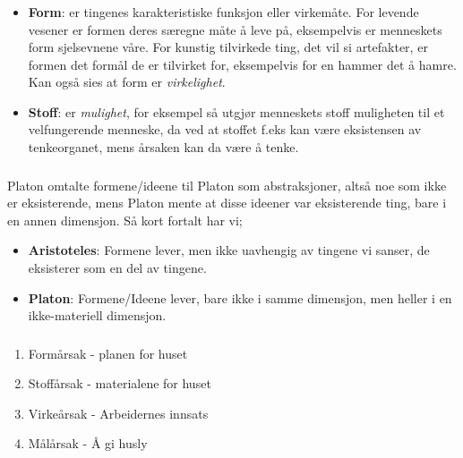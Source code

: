\documentclass[a4paper]{IEEEtran}
\begin{document}
        \subsubsection{}
        \begin{itemize}
            \item \textbf{Form}: er tingenes karakteristiske funksjon eller virkemåte.
            For levende vesener er formen deres særegne måte å leve på, 
            eksempelvis er menneskets form sjelsevnene våre. For kunstig tilvirkede
            ting, det vil si artefakter, er formen det formål de er tilvirket for,
            eksempelvis for en hammer det å hamre. Kan også sies at form er 
            \textit{virkelighet}.

            \item \textbf{Stoff}: er \textit{mulighet}, for eksempel så 
            utgjør menneskets stoff muligheten til et velfungerende menneske, da 
            ved at stoffet f.eks kan være eksistensen av tenkeorganet, mens årsaken 
            kan da være å tenke. 
        \end{itemize} \cite{rephefte_aristoteles} \medskip

        \subsubsection{}
        Platon omtalte formene/ideene til Platon som abstraksjoner, altså noe som 
        ikke er eksisterende, mens Platon mente at disse ideener var eksisterende ting, 
        bare i en annen dimensjon. Så kort fortalt har vi;

        \begin{itemize}
            \item \textbf{Aristoteles}: Formene lever, men ikke uavhengig av tingene
            vi sanser, de eksisterer som en del av tingene.
            \item \textbf{Platon}: Formene/Ideene lever, bare ikke i samme dimensjon, men 
            heller i en ikke-materiell dimensjon.
        \end{itemize}

        \subsubsection{} 
        \begin{enumerate}
            \item Formårsak - planen for huset
            \item Stoffårsak - materialene for huset
            \item Virkeårsak - Arbeidernes innsats
            \item Målårsak - Å gi husly
        \end{enumerate} \cite{rephefte_aristoteles} \medskip
\end{document}
